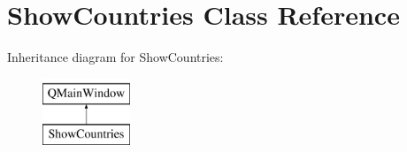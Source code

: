 \hypertarget{class_show_countries}{}\section{Show\+Countries Class Reference}
\label{class_show_countries}
Inheritance diagram for Show\+Countries\+:\begin{figure}[H]
\begin{center}
\leavevmode
\includegraphics[height=2.000000cm]{class_show_countries}
\end{center}
\end{figure}
